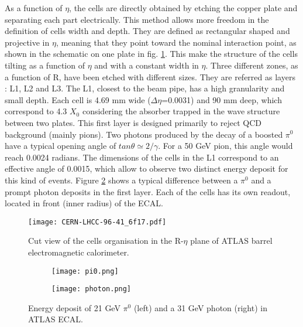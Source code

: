 As a function of $\eta$, the cells are directly obtained by etching the copper plate and separating each part electrically.
This method allows more freedom in the definition of cells width and depth.
They are defined as rectangular shaped and projective in $\eta$, meaning that they point toward the nominal interaction point, as shown in the schematic on one plate in fig. \ref{fig:org2f7ee32}.
This make the structure of the cells tilting as a function of $\eta$ and with a constant width in $\eta$.
Three different zones, as a function of R, have been etched with different sizes.
They are referred as layers : L1, L2 and L3.
The L1, closest to the beam pipe, has a high granularity and small depth.
Each cell is 4.69 mm wide (\(\Delta \eta\)=0.0031) and 90 mm deep,  which correspond to 4.3 $X_0$ considering the absorber trapped in the wave structure between two plates.
This first layer is designed primarily to reject QCD background (mainly pions).
Two photons produced by the decay of a boosted \(\pi^{\text{0}}\) have a typical opening angle of \(tan \theta \simeq 2/\gamma\).
For a 50 GeV pion, this angle would reach 0.0024 radians.
The dimensions of the cells in the L1 correspond to an effective angle of 0.0015, which allow to observe two distinct energy deposit for this kind of events.
Figure \ref{org248c8cf} shows a typical difference between a \(\pi^0\) and a prompt photon deposits in the first layer.
Each of the cells has its own readout, located in front (inner radius) of the ECAL.

\begin{figure}[htbp]
\centering
\texttt{[image: CERN-LHCC-96-41\_6f17.pdf]}
\caption{\label{fig:org2f7ee32}
Cut view of the cells organisation in the R-$\eta$ plane of ATLAS barrel electromagnetic calorimeter.\cite{CERN-LHCC-96-41}}
\end{figure}


\begin{figure}
\begin{subfigure}[t]{0.49\linewidth}
\begin{center}
\texttt{[image: pi0.png]}
\end{center}
\end{subfigure}
\begin{subfigure}[t]{0.49\linewidth}
\begin{center}
\texttt{[image: photon.png]}
\end{center}
\end{subfigure}
\caption{\label{org248c8cf}
Energy deposit of 21 GeV $\pi^0$ (left) and a 31 GeV photon (right) in ATLAS ECAL.\cite{pi0}}
\end{figure}


